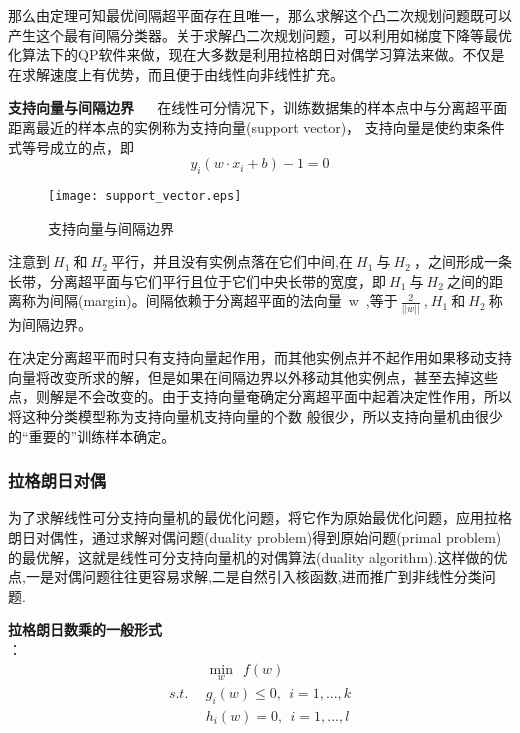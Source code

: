那么由定理可知最优间隔超平面存在且唯一，那么求解这个凸二次规划问题既可以产生这个最有间隔分类器。关于求解凸二次规划问题，可以利用如梯度下降等最优化算法下的QP软件来做，现在大多数是利用拉格朗日对偶学习算法来做。不仅是在求解速度上有优势，而且便于由线性向非线性扩充。

\textbf{支持向量与间隔边界} ~~ 在线性可分情况下，训练数据集的样本点中与分离超平面距离最近的样本点的实例称为支持向量(support vector)， 支持向量是使约束条件式等号成立的点，即
$$y_i(w\cdot x_i+b)-1=0$$

\begin{figure}[!htb]
  \centering
  \texttt{[image: support\_vector.eps]}
  \caption{支持向量与间隔边界}
\end{figure}

注意到$~H_1~$和$~H_2~$平行，并且没有实例点落在它们中间,在$~H_1~$与$~H_2~$，之间形成一条长带，分离超平面与它们平行且位于它们中央长带的宽度，即$~H_1~$与$~H_2~$之间的距离称为间隔(margin)。间隔依赖于分离超平面的法向量~w~,等于$~\frac{2}{||w||}~$,$~H_1~$和$~H_2~$称为间隔边界。

在决定分离超平而时只有支持向量起作用，而其他实例点并不起作用如果移动支持向量将改变所求的解，但是如果在间隔边界以外移动其他实例点，甚至去掉这些点，则解是不会改变的。由于支持向量奄确定分离超平面中起着决定性作用，所以将这种分类模型称为支持向量机支持向量的个数 般很少，所以支持向量机由很少的“重要的”训练样本确定。

\subsubsection{拉格朗日对偶}
为了求解线性可分支持向量机的最优化问题，将它作为原始最优化问题，应用拉格朗日对偶性，通过求解对偶问题(duality problem)得到原始问题(primal problem)的最优解，这就是线性可分支持向量机的对偶算法(duality algorithm).这样做的优点,一是对偶问题往往更容易求解,二是自然引入核函数,进而推广到非线性分类问题.

\textbf{拉格朗日数乘的一般形式}
\\ ：
\begin{align}
            &\min \limits_w ~~f(w)   \nonumber \\
    s.t.~~  &g_i(w)\leq0,~~i=1,...,k\nonumber\\
            &h_i(w) = 0,~~i=1,...,l\nonumber
\end{align}

